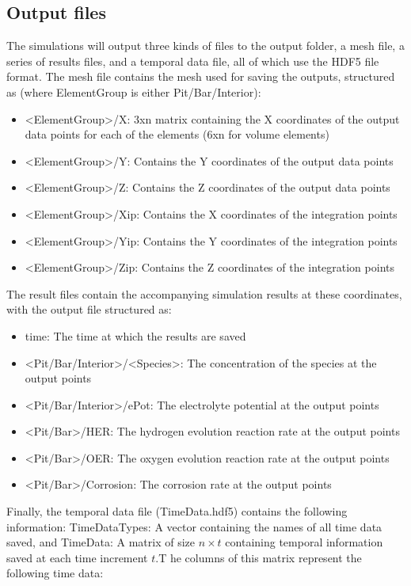 \documentclass[3p]{elsarticle} %
\begin{document}
\subsection{Output files}
The simulations will output three kinds of files to the output folder, a mesh file, a series of results files, and a temporal data file, all of which use the HDF5 file format. The mesh file contains the mesh used for saving the outputs, structured as (where ElementGroup is either Pit/Bar/Interior):
\begin{itemize}
	\item <ElementGroup>/X: 3xn matrix containing the X coordinates of the output data points for each of the elements (6xn for volume elements)
	\item <ElementGroup>/Y: Contains the Y coordinates of the output data points
	\item <ElementGroup>/Z: Contains the Z coordinates of the output data points
	\item <ElementGroup>/Xip: Contains the X coordinates of the integration points
	\item <ElementGroup>/Yip: Contains the Y coordinates of the integration points
	\item <ElementGroup>/Zip: Contains the Z coordinates of the integration points
\end{itemize}
The result files contain the accompanying simulation results at these coordinates, with the output file structured as:
\begin{itemize}
	\item time: The time at which the results are saved
	\item <Pit/Bar/Interior>/<Species>: The concentration of the species at the output points
	\item <Pit/Bar/Interior>/ePot: The electrolyte potential at the output points
	\item <Pit/Bar>/HER: The hydrogen evolution reaction rate at the output points
	\item <Pit/Bar>/OER: The oxygen evolution reaction rate at the output points
	\item <Pit/Bar>/Corrosion: The corrosion rate at the output points
\end{itemize}
Finally, the temporal data file (TimeData.hdf5) contains the following information: TimeDataTypes: A vector containing the names of all time data saved, and TimeData: A matrix of size $n\times t$ containing temporal information saved at each time increment $t$.T he columns of this matrix represent the following time data: 
\end{document}
